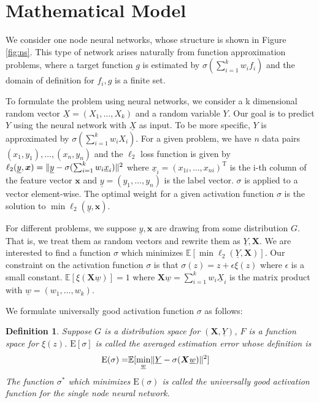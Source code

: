 \documentclass[conference]{IEEEtran}
\newtheorem{definition}{Definition}
\DeclarePairedDelimiter\norm{\lVert}{\rVert}
\def\E{\mathbb{E}}
\def\T{\mathrm{T}}
\begin{document}
\section{Mathematical Model}\label{sec:mm}
We consider one node neural networks, whose structure is shown in Figure \ref{fig:ns}.
This type of network arises naturally from function approximation problems, where a target function $g$
is estimated by $\sigma(\sum_{i=1}^k w_i f_i)$ and the domain of definition for $f_i, g$ is a finite set.

To formulate the problem using neural networks, we consider a k dimensional random vector $\underline{X}=(X_1, \dots, X_k)$ and a random variable $Y$.
Our goal is to predict $Y$ using the neural network with $\underline{X}$ as input.
To be more specific, $Y$ is approximated by $ \sigma(\sum_{i=1}^k w_i X_i)$.
For a given problem, we have $n$ data pairs $(x_1, y_1), \dots, (x_n, y_n)$ and
the $\ell_2$ loss function is given by
$\ell_2(\underline{y}, \bm{x}) = \norm{\underline{y} - \sigma(\sum_{i=1}^k w_i \underline{x}_i)}^2 $
where $\underline{x}_i= (x_{1i}, \dots, x_{ni})^\T$ is the i-th column of the feature vector $\bm{x}$ and
$\underline{y} = (y_1, \dots, y_n)$ is the label vector. $\sigma$ is applied to a vector element-wise.
The optimal weight for a given activation function $\sigma$ is the solution to $\min \ell_2(\underline{y}, \bm{x})$.



For different problems, we suppose $\underline{y}, \bm{x}$ are drawing from some distribution $G$.
That is, we treat them as random vectors and rewrite them as $\underline{Y}, \bm{X}$.
We are interested to find a function $\sigma$ which minimizes
$\E[ \min \ell_2(\underline{Y}, \bm{X})]$.
Our constraint on the activation function $\sigma$ is that
$\sigma(z) = z + \epsilon \xi(z)$ where
$\epsilon$ is a small constant.
$\E[\xi(\bm{X}\underline{w})]=1$ where
$\bm{X}\underline{w} = \sum_{i=1}^k w_i \underline{X}_i$ is the matrix product with  $\underline{w}=(w_1, \dots, w_k)$.

We formulate universally good activation function $\sigma$ as follows:
\begin{definition}\label{def:ug}
Suppose $G$ is a distribution space for $(\bm{X}, \underline{Y})$,
$F$ is a function space for $\xi(z)$.
$\mathrm{E}[\sigma]$ is called the averaged estimation error whose definition is
\begin{align}\label{eq:ug}
\mathrm{E}(\sigma) = & \E[ \min_{\underline{w}} \norm{\underline{Y} - \sigma(\bm{X} \underline{w})}^2] 
\end{align}
The function $\sigma^*$ which minimizes $\mathrm{E}(\sigma)$
is called the universally good activation function for the single node neural network.
\end{definition}
\end{document}
